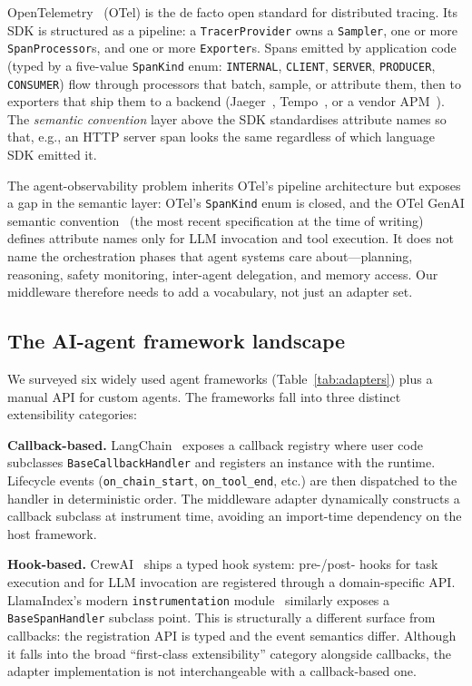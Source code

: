 \documentclass[sigconf,review,anonymous,9pt]{acmart}
\begin{document}
OpenTelemetry~\cite{otel} (OTel) is the de facto open standard for
distributed tracing. Its SDK is structured as a pipeline: a
\texttt{TracerProvider} owns a \texttt{Sampler}, one or more
\texttt{SpanProcessor}s, and one or more \texttt{Exporter}s. Spans
emitted by application code (typed by a five-value \texttt{SpanKind}
enum: \texttt{INTERNAL}, \texttt{CLIENT}, \texttt{SERVER},
\texttt{PRODUCER}, \texttt{CONSUMER}) flow through processors that
batch, sample, or attribute them, then to exporters that ship them to
a backend (Jaeger~\cite{jaeger}, Tempo~\cite{tempo}, or a vendor
APM~\cite{datadog_apm}). The \emph{semantic convention} layer above
the SDK standardises attribute names so that, e.g., an HTTP server
span looks the same regardless of which language SDK emitted it.

The agent-observability problem inherits OTel's pipeline architecture
but exposes a gap in the semantic layer: OTel's \texttt{SpanKind}
enum is closed, and the OTel GenAI semantic
convention~\cite{otel_genai_semconv} (the most recent specification at
the time of writing) defines attribute names only for LLM invocation
and tool execution. It does not name the orchestration phases that
agent systems care about---planning, reasoning, safety monitoring,
inter-agent delegation, and memory access. Our middleware therefore
needs to add a vocabulary, not just an adapter set.

\subsection{The AI-agent framework landscape}

We surveyed six widely used agent frameworks (Table~\ref{tab:adapters})
plus a manual API for custom agents. The frameworks fall into three
distinct extensibility categories:

\textbf{Callback-based.} LangChain~\cite{langchain} exposes a
callback registry where user code subclasses
\texttt{BaseCallbackHandler} and registers an instance with the
runtime. Lifecycle events (\texttt{on\_chain\_start},
\texttt{on\_tool\_end}, etc.) are then dispatched to the handler in
deterministic order. The middleware adapter dynamically constructs a
callback subclass at instrument time, avoiding an import-time
dependency on the host framework.

\textbf{Hook-based.} CrewAI~\cite{crewai} ships a typed hook system:
pre-/post- hooks for task execution and for LLM invocation are
registered through a domain-specific API. LlamaIndex's modern
\texttt{instrumentation} module~\cite{llamaindex} similarly exposes a
\texttt{BaseSpanHandler} subclass point. This is structurally a
different surface from callbacks: the registration API is typed and
the event semantics differ. Although it falls into the broad
``first-class extensibility'' category alongside callbacks, the
adapter implementation is not interchangeable with a callback-based
one.
\end{document}
